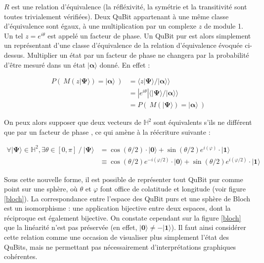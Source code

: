\documentclass[a4paper,12pt]{report}
\newcommand{\prodSc}[2]{\langle #1 / #2 \rangle}
\newcommand{\quSt}[1]{\bm{|#1\rangle}}
\newcommand{\icite}[1]{\up{\textit{\cite{#1}}}}
\newcommand{\para}[1]{\par{#1}\\}
\begin{document}
\par{
	$R$ est une relation d'équivalence (la réfléxivité, la symétrie et la transitivité sont toutes trivialement vérifiées). Deux QuBit appartenant à une même classe d'équivalence sont égaux, à une multiplication par un complexe $z$ de module 1. Un tel $z = e^{i\theta}$ est appelé un facteur de phase. Un QuBit pur est alors simplement un représentant d'une classe d'équivalence de la relation d'équivalence évoquée ci-dessus. Multiplier un état par un facteur de phase ne changera par la probabilité d'être mesuré dans un état $\quSt{\alpha}$ donné. En effet :
}

\begin{align}
	P(~ M( z \quSt{\Psi} ) = \quSt{\alpha} ~) &= \prodSc{z \quSt{\Psi}}{\quSt{\alpha}} \\
	 &= |e^{i\theta}| \prodSc{\quSt{\Psi}}{\quSt{\alpha}} \\
	 &= P(~ M( \quSt{\Psi} ) = \quSt{\alpha} ~)
\end{align}

\vspace{1\baselineskip}

\par{
	On peux alors supposer que deux vecteurs de $\mathbb{H}^2$ sont équivalents s'ils ne différent que par un facteur de phase\icite{ref3} , ce qui amène à la réécriture suivante :
}

\begin{align}
	\label{blochEq}
	\forall \quSt{\Psi} \in \mathbb{H}^2 , \exists \theta \in [0, \pi] ~/~ \quSt{\Psi} &= \cos(\theta/2) \cdot \quSt{0} + \sin(\theta/2) e^{i(\varphi)} \cdot \quSt{1} \\
	&\equiv \cos(\theta/2) e^{-i(\varphi/2)} \cdot \quSt{0} + \sin(\theta/2) e^{i(\varphi/2)} \cdot \quSt{1}
\end{align}

\vspace{1\baselineskip}

\para{
Sous cette nouvelle forme, il est possible de représenter tout QuBit pur comme point sur une sphère, où $\theta$ et $\varphi$ font office de colatitude et longitude (voir figure \ref{bloch}). La correspondance entre l'espace des QuBit purs et une sphère de Bloch est un isomorphisme : une application bijective entre deux espaces, dont la réciproque est également bijective. On constate cependant sur la figure \ref{bloch} que la linéarité n'est pas préservée (en effet, $\quSt{0} \neq -\quSt{1}$). Il faut ainsi considérer cette relation comme une occasion de visualiser plus simplement l'état des QuBits, mais ne permettant pas nécessairement d'interprétations graphiques cohérentes.
}
\end{document}
